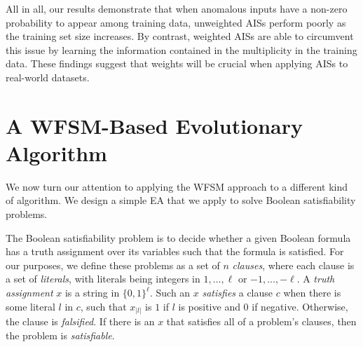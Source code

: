 \documentclass{llncs}
\begin{document}
All in all, our results demonstrate that when anomalous inputs have a non-zero probability
to appear among training data, unweighted AISs perform poorly as the training set size 
increases. By contrast, weighted AISs are able to circumvent this issue by learning 
the information contained in the multiplicity in the training data. These findings 
suggest that weights will be crucial when applying AISs to real-world datasets.

\section{A WFSM-Based Evolutionary Algorithm}
\label{fartheststring}

We now turn our attention to applying the WFSM approach to a different
kind of algorithm.
We design a simple EA that we apply to solve
Boolean satisfiability problems.



The Boolean satisfiability problem is to decide whether a given
Boolean formula has a truth assignment over its
variables such that the formula is satisfied.
For our purposes,
we define these problems as a set of $n$ \emph{clauses},
where each clause is a set of \emph{literals},
with literals being integers in $1, \ldots, \ell$ or
$-1, \ldots,-\ell$.
A \emph{truth assignment} $x$ is a string in $\{0,1\}^\ell$.
Such an $x$ \emph{satisfies} a clause $c$ when there is some literal $l$
in $c$, such that $x_{|l|}$ is $1$ if $l$ is positive and $0$ if negative.
Otherwise, the clause is \emph{falsified}.
If there is an $x$ that satisfies all of a problem's clauses,
then the problem is \emph{satisfiable}.

\end{document}
